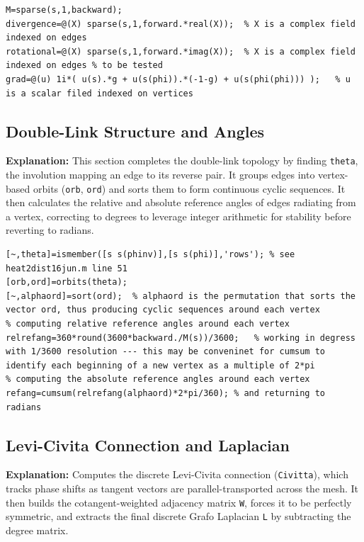\begin{lstlisting}[style=matlab]
% The mass matrix, diverg and grad
M=sparse(s,1,backward);
divergence=@(X) sparse(s,1,forward.*real(X));  % X is a complex field indexed on edges 
rotational=@(X) sparse(s,1,forward.*imag(X));  % X is a complex field indexed on edges % to be tested
grad=@(u) 1i*( u(s).*g + u(s(phi)).*(-1-g) + u(s(phi(phi))) );   % u is a scalar filed indexed on vertices 
\end{lstlisting}

\subsection{Double-Link Structure and Angles}
\textbf{Explanation:} This section completes the double-link topology by finding \texttt{theta}, the involution mapping an edge to its reverse pair. It groups edges into vertex-based orbits (\texttt{orb}, \texttt{ord}) and sorts them to form continuous cyclic sequences. It then calculates the relative and absolute reference angles of edges radiating from a vertex, correcting to degrees to leverage integer arithmetic for stability before reverting to radians.

\begin{lstlisting}[style=matlab]
% completing the double-link structure: (theta,phi)
[~,theta]=ismember([s s(phinv)],[s s(phi)],'rows'); % see heat2dist16jun.m line 51
[orb,ord]=orbits(theta);
[~,alphaord]=sort(ord);  % alphaord is the permutation that sorts the vector ord, thus producing cyclic sequences around each vertex
% computing relative reference angles around each vertex
relrefang=360*round(3600*backward./M(s))/3600;   % working in degress with 1/3600 resolution --- this may be conveninet for cumsum to identify each beginning of a new vertex as a multiple of 2*pi
% computing the absolute reference angles around each vertex
refang=cumsum(relrefang(alphaord)*2*pi/360); % and returning to radians
\end{lstlisting}

\subsection{Levi-Civita Connection and Laplacian}
\textbf{Explanation:} Computes the discrete Levi-Civita connection (\texttt{Civitta}), which tracks phase shifts as tangent vectors are parallel-transported across the mesh. It then builds the cotangent-weighted adjacency matrix \texttt{W}, forces it to be perfectly symmetric, and extracts the final discrete Grafo Laplacian \texttt{L} by subtracting the degree matrix.

